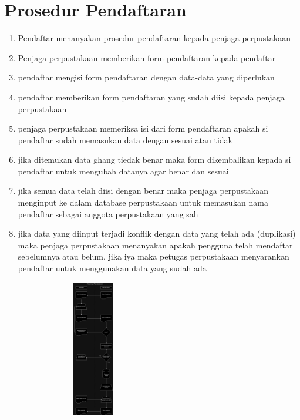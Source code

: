\documentclass[a4paper,12 pt]{article}
\begin{document}
\section{Prosedur Pendaftaran}
\begin{enumerate}
  \item Pendaftar menanyakan prosedur pendaftaran kepada penjaga perpustakaan
  \item Penjaga perpustakaan memberikan form pendaftaran kepada pendaftar
  \item pendaftar mengisi form pendaftaran dengan data-data yang diperlukan
  \item pendaftar memberikan form pendaftaran yang sudah diisi kepada penjaga perpustakaan
  \item penjaga perpustakaan memeriksa isi dari form pendaftaran apakah si pendaftar sudah memasukan data dengan sesuai atau tidak
  \item jika ditemukan data ghang tiedak benar maka form dikembalikan kepada si pendaftar untuk mengubah datanya agar benar dan sesuai
  \item jika semua data telah diisi dengan benar maka penjaga perpustakaan menginput ke dalam database perpustakaan untuk memasukan nama pendaftar sebagai anggota perpustakaan yang sah 
  \item jika data yang diinput terjadi konflik dengan data yang telah ada (duplikasi) maka penjaga perpustakaan menanyakan apakah pengguna telah mendaftar sebelumnya atau belum, jika iya maka petugas perpustakaan menyarankan pendaftar untuk menggunakan data yang sudah ada 

\end{enumerate}

\begin{center}
  \includegraphics[width=8cm,height=6cm]{Picture1}
\end{center}
  
\end{document}
